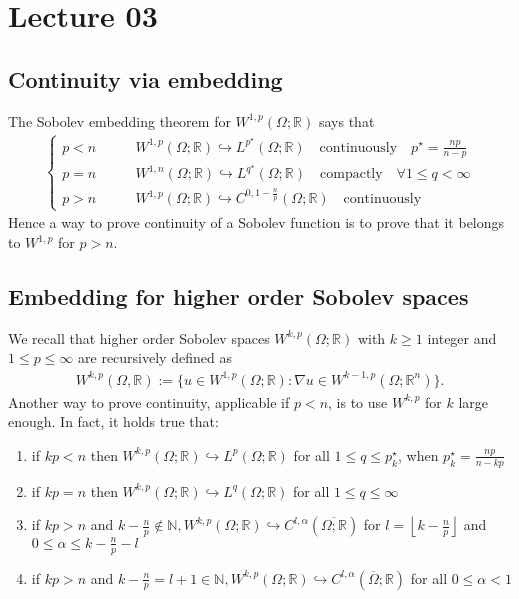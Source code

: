\chapter{Lecture 03}

\section{Continuity via embedding}

The Sobolev embedding theorem for \(W^{1,p}(\Omega; \mathbb{R})\) says that
\begin{align}
	\begin{cases}
		p<n \qquad & W^{1,p}(\Omega; \mathbb{R}) \hookrightarrow L^{p^{\star}}(\Omega;\mathbb{R}) \quad \text{continuously} \quad p^{\star}=\frac{np}{n-p} \\
		p=n \qquad & W^{1,n}(\Omega; \mathbb{R}) \hookrightarrow L^{q^{\star}}(\Omega;\mathbb{R}) \quad \text{compactly} \quad \forall 1 \leq q < \infty   \\
		p>n \qquad & W^{1,p}(\Omega; \mathbb{R}) \hookrightarrow C^{0, 1-\frac{n}{p}}(\Omega;\mathbb{R}) \quad \text{continuously}
	\end{cases}
\end{align}
Hence a way to prove continuity of a Sobolev function is to prove that it belongs to \(W^{1,p}\) for \(p>n\).

\section{Embedding for higher order Sobolev spaces}

We recall that higher order Sobolev spaces \(W^{k,p}(\Omega; \mathbb{R})\) with \(k \geq 1\) integer and \(1 \leq p \leq \infty \) are recursively defined as
\begin{gather}
	W^{k,p}(\Omega, \mathbb{R}):= \{ u \in W^{1,p}(\Omega; \mathbb{R}): \nabla u \in W^{k-1,p}(\Omega; \mathbb{R}^{n})\}.
\end{gather}
Another way to prove continuity, applicable if \(p < n\), is to use \(W^{k,p}\) for \(k\) large enough. In fact, it holds true that:
\begin{enumerate}[label= (\arabic*)]
	\item if \(kp<n\) then \(W^{k,p}(\Omega; \mathbb{R})\hookrightarrow L^{p}(\Omega;\mathbb{R})\) for all \(1 \leq q \leq p_{k}^{\star}\), when \(p_{k}^{\star}=\frac{np}{n-kp}\)
	\item if \(kp=n\) then \(W^{k,p}(\Omega; \mathbb{R}) \hookrightarrow L^{q}(\Omega; \mathbb{R}) \) for all \( 1 \leq q\leq \infty \)
	\item if \( kp > n \) and \( k-\frac{n}{p}\notin \mathbb{N}, W^{k,p}(\Omega;\mathbb{R}) \hookrightarrow C^{l,\alpha}(\overline{\Omega; \mathbb{R}})\) for \( l= \left\lfloor k-\frac{n}{p} \right\rfloor  \) and \( 0 \leq \alpha\leq k-\frac{n}{p}-l \)
	\item if \( kp> n \) and \( k-\frac{n}{p}=l+1 \in \mathbb{N}, W^{k,p}(\Omega; \mathbb{R}) \hookrightarrow C^{l,\alpha} (\overline{\Omega}; \mathbb{R})\) for all \( 0 \leq \alpha < 1 \)
\end{enumerate}

